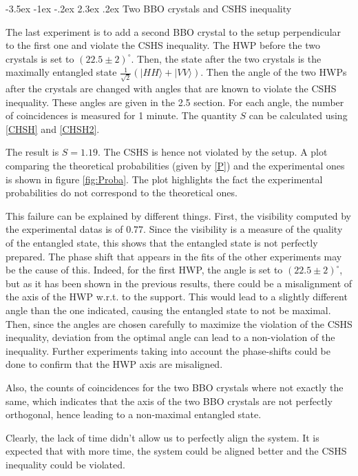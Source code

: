 \documentclass[a4paper, 12pt,oneside]{article}
\makeatletter
\renewcommand{\subsection}{\@startsection {subsection}{1}{\z@}%
             {-3.5ex \@plus -1ex \@minus -.2ex}%
             {2.3ex \@plus.2ex}%
             {\normalfont\normalsize\bfseries}}
\makeatother
\begin{document}
\subsection{Two BBO crystals and CSHS inequality}

The last experiment is to add a second BBO crystal to the setup perpendicular to the first one and violate the CSHS inequality. The HWP before the two crystals is set to $(22.5\pm2)^{\circ}$. Then, the state after the two crystals is the maximally entangled state $\frac{1}{\sqrt{2}}(|HH\rangle + |VV\rangle)$. Then the angle of the two HWPs after the crystals are changed with angles that are known to violate the CSHS inequality. These angles are given in the 2.5 section. For each angle, the number of coincidences is measured for 1 minute. The quantity $S$ can be calculated using \eqref{CHSH} and \eqref{CHSH2}.

The result is $S = 1.19$. The CSHS is hence not violated by the setup. A plot comparing the theoretical probabilities (given by \eqref{P}) and the experimental ones is shown in figure \ref{fig:Proba}. The plot highlights the fact the experimental probabilities do not correspond to the theoretical ones.

This failure can be explained by different things. First, the visibility computed by the experimental datas is of $0.77$. Since the visibility is a measure of the quality of the entangled state, this shows that the entangled state is not perfectly prepared. The phase shift that appears in the fits of the other experiments may be the cause of this. Indeed, for the first HWP, the angle is set to $(22.5\pm2)^{\circ}$, but as it has been shown in the previous results, there could be a misalignment of the axis of the HWP w.r.t. to the support. This would lead to a slightly different angle than the one indicated, causing the entangled state to not be maximal. Then, since the angles are chosen carefully to maximize the violation of the CSHS inequality, deviation from the optimal angle can lead to a non-violation of the inequality. Further experiments taking into account the phase-shifts could be done to confirm that the HWP axis are misaligned. 

Also, the counts of coincidences for the two BBO crystals where not exactly the same, which indicates that the axis of the two BBO crystals are not perfectly orthogonal, hence leading to a non-maximal entangled state.

Clearly, the lack of time didn't allow us to perfectly align the system. It is expected that with more time, the system could be aligned better and the CSHS inequality could be violated.
\end{document}
